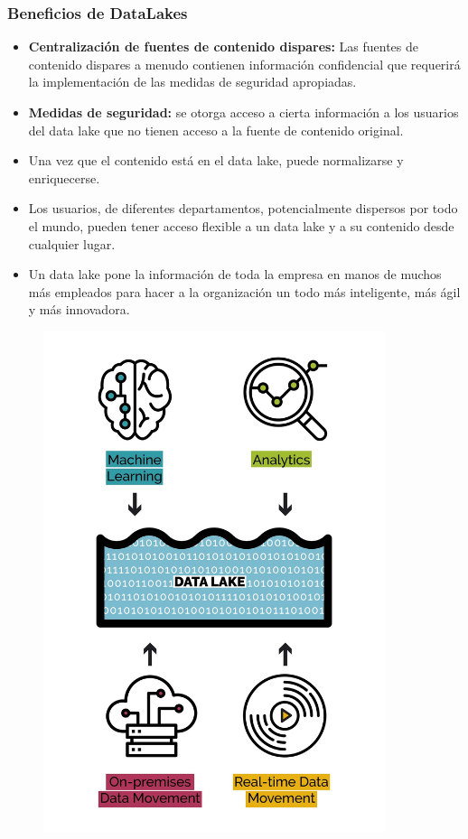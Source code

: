 \documentclass[%
 reprint,
 amsmath,amssymb,
 aps,
]{revtex4-1}
\begin{document}
\subsubsection{\textbf{Beneficios de DataLakes}}
\begin{itemize}
	\item \textbf{ Centralización de fuentes de contenido dispares:} Las fuentes de contenido dispares a menudo contienen información confidencial que requerirá la implementación de las medidas de seguridad apropiadas.
	\item  \textbf{ Medidas de seguridad:} se otorga acceso a cierta información a los usuarios del data lake que no tienen acceso a la fuente de contenido original. 
	\item  Una vez que el contenido está en el data lake, puede normalizarse y enriquecerse. 
	\item  Los usuarios, de diferentes departamentos, potencialmente dispersos por todo el mundo, pueden tener acceso flexible a un data lake y a su contenido desde cualquier lugar.
	\item Un data lake pone la información de toda la empresa en manos de muchos más empleados para hacer a la organización un todo más inteligente, más ágil y más innovadora.
\end{itemize}

\begin{figure}[htb]
				\begin{center}
					\includegraphics[width=10cm]{./IMAGENES/datalake}
				\end{center}
			\end{figure}
\end{document}
